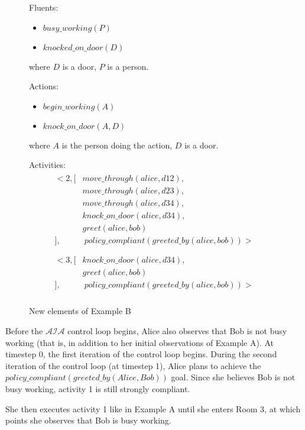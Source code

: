 \begin{figure}[h]
    \begin{framed}
        Fluents:
        \begin{itemize}
            \item $busy\_working(P)$
            \item $knocked\_on\_door(D)$
        \end{itemize}
        where $D$ is a door, $P$ is a person.

        Actions:
        \begin{itemize}
            \item $begin\_working(A)$
            \item $knock\_on\_door(A, D)$
        \end{itemize}
        where $A$ is the person doing the action, $D$ is a door.

        Activities:
        \begin{gather}
        \begin{split}
            <2, [
                & move\_through(alice, d12), \\
                & move\_through(alice, d23), \\
                & move\_through(alice, d34), \\
                & knock\_on\_door(alice, d34), \\
                & greet(alice, bob) \\
            ], & \ policy\_compliant(greeted\_by(alice, bob))> \\
        \end{split} \\
        \begin{split}
            <3, [
                & knock\_on\_door(alice, d34), \\
                & greet(alice, bob) \\
            ], & \ policy\_compliant(greeted\_by(alice, bob))> \\
        \end{split}
        \end{gather}
    \end{framed}
    \caption{New elements of Example B}
    \label{fig:apia_example_b_description}
\end{figure}

Before the $\mathcal{AIA}$ control loop begins, Alice also observes that Bob is not busy working (that is, in addition to her initial observations of Example A).
At timestep 0, the first iteration of the control loop begins.
During the second iteration of the control loop (at timestep 1), Alice plans to achieve the $policy\_compliant(greeted\_by(Alice, Bob))$ goal.
Since she believes Bob is not busy working, activity 1 is still strongly compliant.

She then executes activity 1 like in Example A until she enters Room 3, at which points she observes that Bob is busy working.
